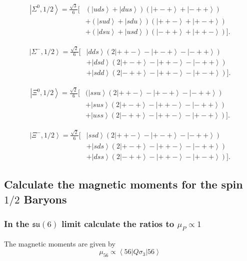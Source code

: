 \documentclass[main.tex]{subfiles}
\begin{document}
\begin{align}
\left|\Sigma^0,1/2\right>=\frac{\sqrt{3}}{6}\big[& (\left|uds\right>+\left|dus\right>)(\left|+-+\right>+\left|-++\right>)\nonumber\\
&+(\left|sud\right>+\left|sdu\right>)(\left|++-\right>+\left|+-+\right>)\nonumber\\
&+(\left|dsu\right>+\left|usd\right>)(\left|-++\right>+\left|++-\right>)\big].
\end{align}

\begin{align}
\left|\Sigma^-,1/2\right>=\frac{\sqrt{2}}{6}\big[& \left|dds\right>(2\left|++-\right>-\left|+-+\right>-\left|-++\right>)\nonumber\\
&+\left|dsd\right>(2\left|+-+\right>-\left|++-\right>-\left|-++\right>)\nonumber\\
&+\left|sdd\right>(2\left|-++\right>-\left|++-\right>-\left|+-+\right>)\big].
\end{align}

\begin{align}
\left|\Xi^0,1/2\right>=\frac{\sqrt{2}}{6}\big[& (\left|ssu\right>(2\left|++-\right>-\left|+-+\right>-\left|-++\right>)\nonumber\\
&+\left|sus\right>(2\left|+-+\right>-\left|++-\right>-\left|-++\right>)\nonumber\\
&+\left|uss\right>(2\left|-++\right>-\left|++-\right>-\left|+-+\right>)\big].
\end{align}

\begin{align}
\left|\Xi^-,1/2\right>=\frac{\sqrt{2}}{6}\big[& \left|ssd\right>(2\left|++-\right>-\left|+-+\right>-\left|-++\right>)\nonumber\\
&+\left|sds\right>(2\left|+-+\right>-\left|++-\right>-\left|-++\right>)\nonumber\\
&+\left|dss\right>(2\left|-++\right>-\left|++-\right>-\left|+-+\right>)\big].
\end{align}


\subsection{Calculate the magnetic moments for the spin $1/2$ Baryons}
\subsubsection{In the $\mathfrak{su}(6)$ limit calculate the ratios to $\mu_P\propto1$}
The magnetic moments are given by
\begin{equation}
\mu_{56}\propto\left<56|Q\sigma_3|56\right>
\end{equation}
\end{document}
